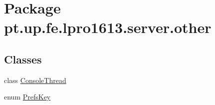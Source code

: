 \hypertarget{namespacept_1_1up_1_1fe_1_1lpro1613_1_1server_1_1other}{}\section{Package pt.\+up.\+fe.\+lpro1613.\+server.\+other}
\label{namespacept_1_1up_1_1fe_1_1lpro1613_1_1server_1_1other}
\subsection*{Classes}
\begin{DoxyCompactItemize}
\item 
class \hyperlink{classpt_1_1up_1_1fe_1_1lpro1613_1_1server_1_1other_1_1_console_thread}{Console\+Thread}
\item 
enum \hyperlink{enumpt_1_1up_1_1fe_1_1lpro1613_1_1server_1_1other_1_1_prefs_key}{Prefs\+Key}
\end{DoxyCompactItemize}
